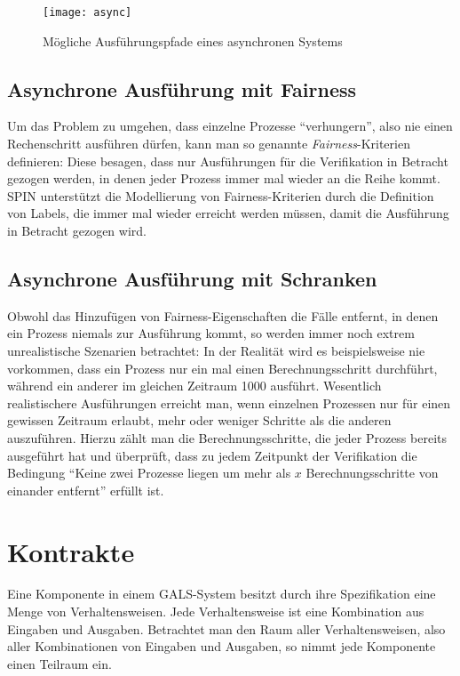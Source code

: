 \begin{figure}[h]
  \centering
  \texttt{[image: async]}
  \caption{Mögliche Ausführungspfade eines asynchronen Systems}
  \label{fig:asynchronous_paths}
\end{figure}
\subsection{Asynchrone Ausführung mit Fairness}
Um das Problem zu umgehen, dass einzelne Prozesse "`verhungern"', also nie einen Rechenschritt ausführen dürfen, kann man so genannte \emph{Fairness}-Kriterien definieren:
Diese besagen, dass nur Ausführungen für die Verifikation in Betracht gezogen werden, in denen jeder Prozess immer mal wieder an die Reihe kommt.
SPIN unterstützt die Modellierung von Fairness-Kriterien durch die Definition von Labels, die immer mal wieder erreicht werden müssen, damit die Ausführung in Betracht gezogen wird.
\subsection{Asynchrone Ausführung mit Schranken}
Obwohl das Hinzufügen von Fairness-Eigenschaften die Fälle entfernt, in denen ein Prozess niemals zur Ausführung kommt, so werden immer noch extrem unrealistische Szenarien betrachtet:
In der Realität wird es beispielsweise nie vorkommen, dass ein Prozess nur ein mal einen Berechnungsschritt durchführt, während ein anderer im gleichen Zeitraum 1000 ausführt.
Wesentlich realistischere Ausführungen erreicht man, wenn einzelnen Prozessen nur für einen gewissen Zeitraum erlaubt, mehr oder weniger Schritte als die anderen auszuführen.
Hierzu zählt man die Berechnungsschritte, die jeder Prozess bereits ausgeführt hat und überprüft, dass zu jedem Zeitpunkt der Verifikation die Bedingung "`Keine zwei Prozesse liegen um mehr als $x$ Berechnungsschritte von einander entfernt"' erfüllt ist.
\section{Kontrakte}
\label{sec:contracts}
Eine Komponente in einem GALS-System besitzt durch ihre Spezifikation eine Menge von Verhaltensweisen.
Jede Verhaltensweise ist eine Kombination aus Eingaben und Ausgaben.
Betrachtet man den Raum aller Verhaltensweisen, also aller Kombinationen von Eingaben und Ausgaben, so nimmt jede Komponente einen Teilraum ein.

